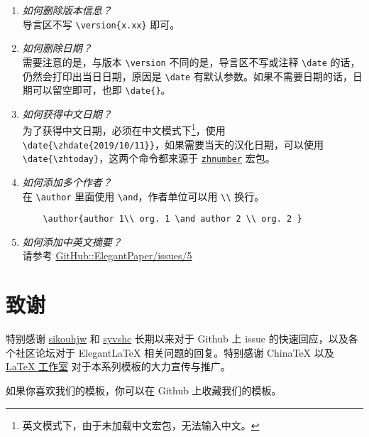 \documentclass[lang=cn,11pt,a4paper]{elegantpaper}
\begin{document}
\begin{enumerate}[label=\arabic*).]
  \item \textit{如何删除版本信息？}\\
    导言区不写 \lstinline|\version{x.xx}| 即可。
  \item \textit{如何删除日期？}\\
    需要注意的是，与版本 \lstinline{\version} 不同的是，导言区不写或注释 \lstinline{\date} 的话，仍然会打印出当日日期，原因是 \lstinline{\date} 有默认参数。如果不需要日期的话，日期可以留空即可，也即 \lstinline|\date{}|。
  \item \textit{如何获得中文日期？}\\
    为了获得中文日期，必须在中文模式下\footnote{英文模式下，由于未加载中文宏包，无法输入中文。}，使用 \lstinline|\date{\zhdate{2019/10/11}}|，如果需要当天的汉化日期，可以使用 \lstinline|\date{\zhtoday}|，这两个命令都来源于 \href{https://ctan.org/pkg/zhnumber}{\lstinline{zhnumber}} 宏包。
  \item \textit{如何添加多个作者？}\\
    在 \lstinline{\author} 里面使用 \lstinline{\and}，作者单位可以用 \lstinline{\\} 换行。
    \begin{lstlisting}
    \author{author 1\\ org. 1 \and author 2 \\ org. 2 }
    \end{lstlisting}
  \item \textit{如何添加中英文摘要？}\\
    请参考 \href{https://github.com/ElegantLaTeX/ElegantPaper/issues/5}{GitHub::ElegantPaper/issues/5}
\end{enumerate}


\section{致谢}

特别感谢 \href{https://github.com/sikouhjw}{sikouhjw} 和 \href{https://github.com/syvshc}{syvshc}  长期以来对于 Github 上 issue 的快速回应，以及各个社区论坛对于 ElegantLaTeX 相关问题的回复。特别感谢 ChinaTeX 以及 \href{http://www.latexstudio.net/}{LaTeX 工作室} 对于本系列模板的大力宣传与推广。

如果你喜欢我们的模板，你可以在 Github 上收藏我们的模板。

\nocite{*}
\printbibliography[heading=bibintoc, title=\ebibname]

\appendix
\addappheadtotoc
\end{document}
